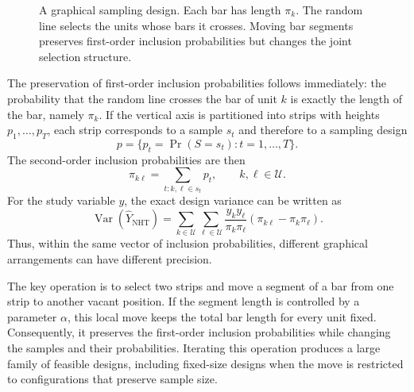 \documentclass[twoside]{article}
\newcommand{\U}{\mathcal{U}}
\newcommand{\Sample}{S}
\newcommand{\NHT}{\mathrm{NHT}}
\newcommand{\Var}{\operatorname{Var}}
\newcommand{\pr}{\operatorname{Pr}}
\begin{document}
\begin{figure}[ht]
\begin{center}
\caption{\footnotesize{A graphical sampling design. Each bar has length $\pi_k$.
The random line selects the units whose bars it crosses. Moving bar segments
preserves first-order inclusion probabilities but changes the joint selection
structure.}}\label{fig:gfs}
\end{center}
\end{figure}

The preservation of first-order inclusion probabilities follows immediately:
the probability that the random line crosses the bar of unit $k$ is exactly
the length of the bar, namely $\pi_k$. If the vertical axis is partitioned
into strips with heights $p_1,\ldots,p_T$, each strip corresponds to a sample
$s_t$ and therefore to a sampling design
\[
    p=\{p_t=\pr(\Sample=s_t):t=1,\ldots,T\}.
\]
The second-order inclusion probabilities are then
\[
    \pi_{k\ell}=\sum_{t:k,\ell\in s_t}p_t,\qquad k,\ell\in\U.
\]
For the study variable $y$, the exact design variance can be written as
\begin{equation}\label{eq:nhtvar}
    \Var(\widehat Y_{\NHT})
    =
    \sum_{k\in\U}\sum_{\ell\in\U}
    \frac{y_k y_\ell}{\pi_k\pi_\ell}
    \left(\pi_{k\ell}-\pi_k\pi_\ell\right).
\end{equation}
Thus, within the same vector of inclusion probabilities, different graphical
arrangements can have different precision.

The key operation is to select two strips and move a segment of a bar from
one strip to another vacant position. If the segment length is controlled by
a parameter $\alpha$, this local move keeps the total bar length for every
unit fixed. Consequently, it preserves the first-order inclusion probabilities
while changing the samples and their probabilities. Iterating this operation
produces a large family of feasible designs, including fixed-size designs
when the move is restricted to configurations that preserve sample size.
\end{document}
